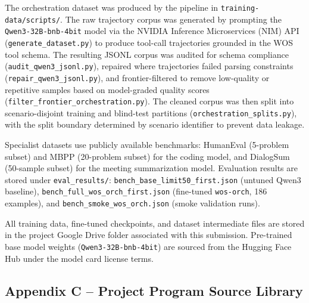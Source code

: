 \documentclass[conference]{IEEEtran}
\begin{document}
The orchestration dataset was produced by the pipeline in \texttt{training-data/scripts/}. The raw trajectory corpus was generated by prompting the \texttt{Qwen3-32B-bnb-4bit} model via the NVIDIA Inference Microservices (NIM) API (\texttt{generate\_dataset.py}) to produce tool-call trajectories grounded in the WOS tool schema. The resulting JSONL corpus was audited for schema compliance (\texttt{audit\_qwen3\_jsonl.py}), repaired where trajectories failed parsing constraints (\texttt{repair\_qwen3\_jsonl.py}), and frontier-filtered to remove low-quality or repetitive samples based on model-graded quality scores (\texttt{filter\_frontier\_orchestration.py}). The cleaned corpus was then split into scenario-disjoint training and blind-test partitions (\texttt{orchestration\_splits.py}), with the split boundary determined by scenario identifier to prevent data leakage.

Specialist datasets use publicly available benchmarks: HumanEval (5-problem subset) and MBPP (20-problem subset) for the coding model, and DialogSum (50-sample subset) for the meeting summarization model. Evaluation results are stored under \texttt{eval\_results/}: \texttt{bench\_base\_limit50\_first.json} (untuned Qwen3 baseline), \texttt{bench\_full\_wos\_orch\_first.json} (fine-tuned \texttt{wos-orch}, 186 examples), and \texttt{bench\_smoke\_wos\_orch.json} (smoke validation runs).

All training data, fine-tuned checkpoints, and dataset intermediate files are stored in the project Google Drive folder associated with this submission. Pre-trained base model weights (\texttt{Qwen3-32B-bnb-4bit}) are sourced from the Hugging Face Hub under the model card license terms.

\subsection*{Appendix C -- Project Program Source Library}
\end{document}
